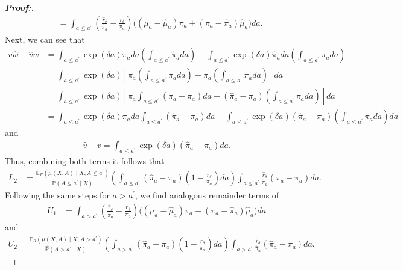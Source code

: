 \documentclass[11pt,twoside]{article}
\theoremstyle{definition}
\theoremstyle{remark}
\begin{document}
\begin{proof}[\textbf{Proof:}]
\begin{align*}
    &= \int_{a \leq a^{\prime}}\left(\frac{\widehat{r}_\delta}{\widehat{\pi}_a} - \frac{r_\delta}{\pi_a} \right)\Big( (\mu_a - \widehat{\mu}_a)\pi_a + (\pi_a - \widehat{\pi}_a) \widehat{\mu}_a \Big) da.
\end{align*}
Next, we can see that
\begin{align*}
    v\widehat{w} -\widehat{v} w &= \int_{a \leq a^{\prime}} \exp(\delta a) \pi_a da \left(\int_{a \leq a^{\prime}} \widehat{\pi}_a da\right) - \int_{a \leq a^{\prime}} \exp(\delta a) \widehat{\pi}_a da \left(\int_{a \leq a^{\prime}} \pi_a da\right) \\
    &= \int_{a \leq a^{\prime}} \exp(\delta a) \left[\pi_a \left(\int_{a \leq a^{\prime}} \widehat{\pi}_a da\right) - \widehat{\pi}_a \left(\int_{a \leq a^{\prime}} \pi_a da\right) \right] da \\
    &= \int_{a \leq a^{\prime}} \exp(\delta a) \left[\pi_a \int_{a \leq a^{\prime}} (\widehat{\pi}_a - \pi_a) da - (\widehat{\pi}_a - \pi_a) \left(\int_{a \leq a^{\prime}} \pi_a da\right) \right] da \\
    &=  \int_{a \leq a^{\prime}} \exp(\delta a) \pi_a da \int_{a \leq a^{\prime}} (\widehat{\pi}_a - \pi_a) da - \int_{a \leq a^{\prime}} \exp(\delta a) (\widehat{\pi}_a - \pi_a) \left(\int_{a \leq a^{\prime}} \pi_a da\right) da
\end{align*}
and
\begin{align*}
    \widehat{v} - v = \int_{a \leq a^{\prime}} \exp(\delta a) (\widehat{\pi}_a - \pi_a) da.
\end{align*}
Thus, combining both terms it follows that
\begin{align*}
    L_2 &= \frac{\widehat{\mathbb{E}}_R\left(\mu(X, A) \mid X, A \leq a^{\prime} \right)}{\widehat{\mathbb{P}}(A \leq a^{\prime} \mid X)}\left( \int_{a \leq a^{\prime}} (\widehat{\pi}_a - \pi_a)\left( 1 - \frac{r_\delta}{\pi_a} \right)  da \right)\int_{a \leq a^{\prime}} \frac{\widehat{r}_\delta}{\widehat{\pi}_a} (\widehat{\pi}_a - \pi_a) da.
\end{align*}
Following the same steps for $a > a^{\prime}$, we find analogous remainder terms of
\begin{align*}
    U_1 &= \int_{a > a^{\prime}}\left(\frac{\widehat{r}_\delta}{\widehat{\pi}_a} - \frac{r_\delta}{\pi_a} \right)\Big( (\mu_a - \widehat{\mu}_a)\pi_a + (\pi_a - \widehat{\pi}_a) \widehat{\mu}_a \Big) da
\end{align*}
and
\begin{align*}
    U_2 = \frac{\widehat{\mathbb{E}}_R\left(\mu(X, A) \mid X, A > a^{\prime} \right)}{\widehat{\mathbb{P}}(A > a^{\prime} \mid X)}\left( \int_{a > a^{\prime}} (\widehat{\pi}_a - \pi_a)\left( 1 - \frac{r_\delta}{\pi_a} \right)  da \right)\int_{a > a^{\prime}} \frac{\widehat{r}_\delta}{\widehat{\pi}_a} (\widehat{\pi}_a - \pi_a) da.

\end{align*}
\end{proof}
\end{document}
